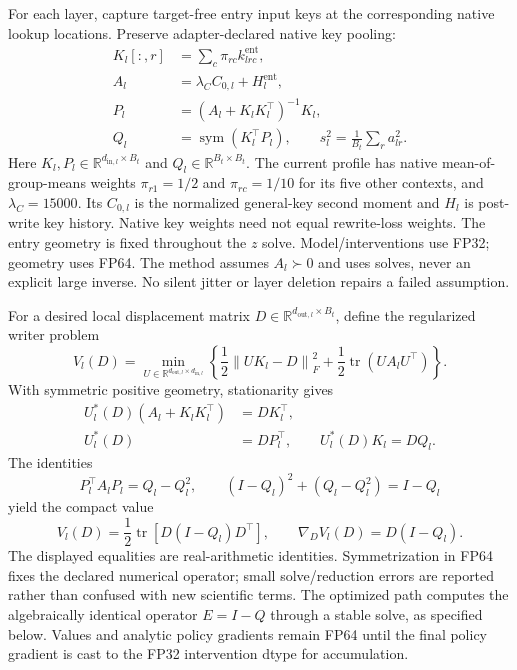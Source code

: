 \documentclass[11pt]{article}
\newcommand{\entry}{\mathrm{ent}}
\newcommand{\tr}{\operatorname{tr}}
\newcommand{\sym}{\operatorname{sym}}
\newcommand{\norm}[1]{\left\lVert#1\right\rVert}
\newcommand{\R}{\mathbb R}
\begin{document}
For each layer, capture target-free entry input keys at the corresponding
native lookup locations. Preserve adapter-declared native key pooling:
\begin{align}
 K_l[:,r]&=\sum_c\pi_{rc}k_{lrc}^{\entry},\\
 A_l&=\lambda_C C_{0,l}+H_l^{\entry},\\
 P_l&=(A_l+K_lK_l^\top)^{-1}K_l,\\
 Q_l&=\sym(K_l^\top P_l),\qquad
 s_l^2=\frac1{B_t}\sum_r a_{lr}^2.
 \label{eq:geometry}
\end{align}
Here $K_l,P_l\in\R^{d_{\mathrm{in},l}\times B_t}$ and
$Q_l\in\R^{B_t\times B_t}$. The current profile has native
mean-of-group-means weights $\pi_{r1}=1/2$ and $\pi_{rc}=1/10$ for its five
other contexts, and $\lambda_C=15000$. Its $C_{0,l}$ is the normalized
general-key second moment and $H_l$ is post-write key history. Native key
weights need not equal rewrite-loss weights. The entry geometry is fixed
throughout the $z$ solve. Model/interventions use FP32; geometry uses FP64.
The method assumes $A_l\succ0$ and uses solves, never an explicit large
inverse. No silent jitter or layer deletion repairs a failed assumption.

For a desired local displacement matrix $D\in\R^{d_{\mathrm{out},l}\times B_t}$, define the
regularized writer problem
\begin{equation}
 V_l(D)=\min_{U\in\R^{d_{\mathrm{out},l}\times d_{\mathrm{in},l}}}
 \left\{\frac12\norm{UK_l-D}_F^2
             +\frac12\tr(UA_lU^\top)\right\}.
 \label{eq:value-problem}
\end{equation}
With symmetric positive geometry, stationarity gives
\begin{align}
 U_l^*(D)(A_l+K_lK_l^\top)&=DK_l^\top,\\
 U_l^*(D)&=DP_l^\top,\qquad U_l^*(D)K_l=DQ_l.
\end{align}
The identities
\[
 P_l^\top A_lP_l=Q_l-Q_l^2,\qquad
 (I-Q_l)^2+(Q_l-Q_l^2)=I-Q_l
\]
yield the compact value
\begin{equation}
 \boxed{V_l(D)=\frac12\tr\!\left[D(I-Q_l)D^\top\right]},\qquad
 \nabla_D V_l(D)=D(I-Q_l).
 \label{eq:value}
\end{equation}
The displayed equalities are real-arithmetic identities. Symmetrization in
FP64 fixes the declared numerical operator; small solve/reduction errors
are reported rather than confused with new scientific terms.
The optimized path computes the algebraically identical operator
$E=I-Q$ through a stable solve, as specified below. Values and analytic
policy gradients remain FP64 until the final policy gradient is cast to
the FP32 intervention dtype for accumulation.
\end{document}
